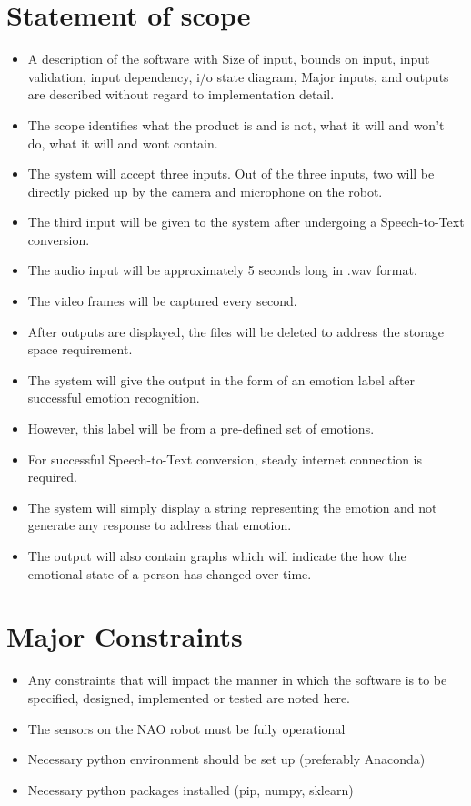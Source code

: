 \documentclass[oneside,a4paper,12pt]{report}
\begin{document}
\begin{normalsize}
 \section{Statement of scope}
	\begin{itemize}  
	\item	A description of the software with Size of input, bounds on input, input validation, input dependency, i/o state diagram, Major inputs, and outputs are described without regard to implementation detail.
	\item The scope identifies what the product is and is not, what it will and won’t do, what it will and wont contain.
	
	
	\item The system will accept three inputs. Out of the three inputs, two will be directly picked up by the camera and microphone on the robot.
	\item The third input will be given to the system after undergoing a Speech-to-Text conversion.
	\item The audio input will be approximately 5 seconds long in .wav format.
	\item The video frames will be captured every second.
	\item After outputs are displayed, the files will be deleted to address the storage space requirement.
	\item The system will give the output in the form of an emotion label after successful emotion recognition.
	\item However, this label will be from a pre-defined set of emotions.
	\item For successful Speech-to-Text conversion, steady internet connection is required.
	\item The system will simply display a string representing the emotion and not generate any response to address that emotion.
	\item The output will also contain graphs which will indicate the how the emotional state of a person has changed over time.
	\end{itemize}

\vspace{4mm}
\section{Major Constraints}
\begin{itemize}
\item Any constraints that will impact the manner in which the software is to be specified, designed, implemented or tested are noted here.
\item The sensors on the NAO robot must be fully operational
\item Necessary python environment should be set up (preferably Anaconda)
\item Necessary python packages installed (pip, numpy, sklearn)


\end{itemize}
\end{normalsize}
\end{document}
